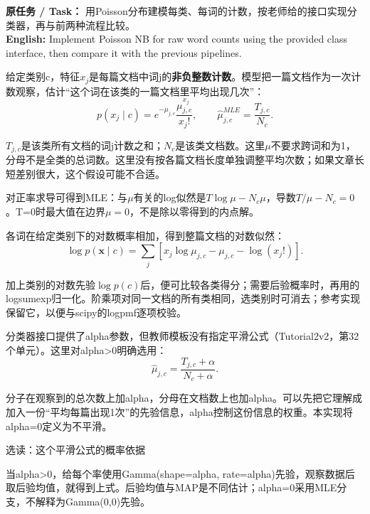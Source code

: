 \textbf{原任务 / Task：} 用Poisson分布建模每类、每词的计数，按老师给的接口实现分类器，再与前两种流程比较。\\

\textbf{English:} Implement Poisson NB for raw word counts using the provided class interface, then compare it with the previous pipelines.





给定类别c，特征\(x_j\)是每篇文档中词j的\textbf{非负整数计数}。模型把一篇文档作为一次计数观察，估计“这个词在该类的一篇文档里平均出现几次”：
\[
p(x_j\mid c)=e^{-\mu_{j,c}}\frac{\mu_{j,c}^{x_j}}{x_j!},
\qquad
\hat\mu^{MLE}_{j,c}=\frac{T_{j,c}}{N_c}.\tag{T2.1}
\]


\(T_{j,c}\)是该类所有文档的词j计数之和；\(N_c\)是该类文档数。这里\(\mu\)不要求跨词和为1，分母不是全类的总词数。这里没有按各篇文档长度单独调整平均次数；如果文章长短差别很大，这个假设可能不合适。


对正率求导可得到MLE：与\(\mu\)有关的log似然是\(T\log\mu-N_c\mu\)，导数\(T/\mu-N_c=0\)。T=0时最大值在边界\(\mu=0\)，不是除以零得到的内点解。


各词在给定类别下的对数概率相加，得到整篇文档的对数似然：
\[
\log p(\mathbf{x}\mid c)=
\sum_j[x_j\log\mu_{j,c}-\mu_{j,c}-\log(x_j!)].\tag{T2.2}
\]


加上类别的对数先验\(\log p(c)\)后，便可比较各类得分；需要后验概率时，再用的logsumexp归一化。阶乘项对同一文档的所有类相同，选类别时可消去；参考实现保留它，以便与scipy的logpmf逐项校验。





分类器接口提供了alpha参数，但教师模板没有指定平滑公式（Tutorial2v2，第32个单元）。这里对alpha>0明确选用：
\[
\hat\mu_{j,c}=\frac{T_{j,c}+\alpha}{N_c+\alpha}.\tag{T2.3}
\]


分子在观察到的总次数上加alpha，分母在文档数上也加alpha。可以先把它理解成加入一份“平均每篇出现1次”的先验信息，alpha控制这份信息的权重。本实现将alpha=0定义为不平滑。



\begin{StudySolution}{选读：这个平滑公式的概率依据}


当alpha>0，给每个率使用Gamma(shape=alpha, rate=alpha)先验，观察数据后取后验均值，就得到上式。后验均值与MAP是不同估计；alpha=0采用MLE分支，不解释为Gamma(0,0)先验。


\end{StudySolution}


